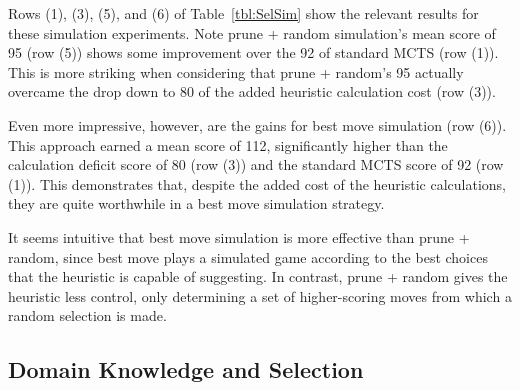 \documentclass[letterpaper]{article}
\begin{document}
Rows (1), (3), (5), and (6) of Table~\ref{tbl:SelSim} show the relevant results for these simulation experiments. Note prune + random simulation's mean score of 95 (row (5)) shows some improvement over the 92 of standard MCTS (row (1)). This is more striking when considering that prune + random's 95 actually overcame the drop down to 80 of the added heuristic calculation cost (row (3)).

Even more impressive, however, are the gains for best move simulation (row (6)). This approach earned a mean score of 112, significantly higher than the calculation deficit score of 80 (row (3)) and the standard MCTS score of 92 (row (1)). This demonstrates that, despite the added cost of the heuristic calculations, they are quite worthwhile in a best move simulation strategy.

It seems intuitive that best move simulation is more effective than prune + random, since best move plays a simulated game according to the best choices that the heuristic is capable of suggesting. In contrast, prune + random gives the heuristic less control, only determining a set of higher-scoring moves from which a random selection is made.


\subsection{Domain Knowledge and Selection}

%
\end{document}
